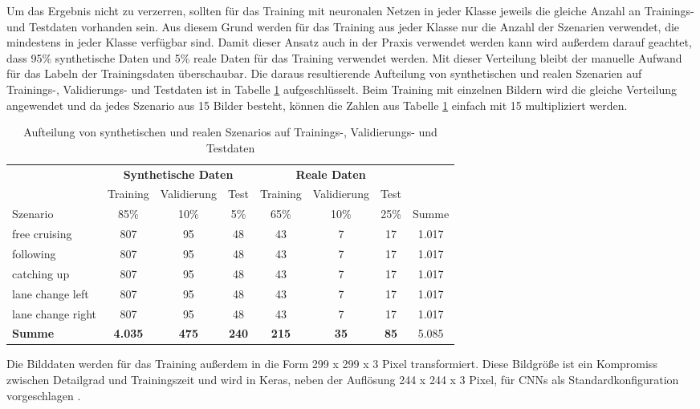 Um das Ergebnis nicht zu verzerren, sollten für das Training mit neuronalen Netzen in jeder Klasse jeweils die gleiche Anzahl an Trainings- und Testdaten vorhanden sein. Aus diesem Grund werden für das Training aus jeder Klasse nur die Anzahl der Szenarien verwendet, die mindestens in jeder Klasse verfügbar sind. Damit dieser Ansatz auch in der Praxis verwendet werden kann wird außerdem darauf geachtet, dass 95\% synthetische Daten und 5\% reale Daten für das Training verwendet werden. Mit dieser Verteilung bleibt der manuelle Aufwand für das Labeln der Trainingsdaten überschaubar. Die daraus resultierende Aufteilung von synthetischen und realen Szenarien auf Trainings-, Validierungs- und Testdaten ist in Tabelle \ref{tab_daten_aufteilung} aufgeschlüsselt. Beim Training mit einzelnen Bildern wird die gleiche Verteilung angewendet und da jedes Szenario aus 15 Bilder besteht, können die Zahlen aus Tabelle \ref{tab_daten_aufteilung} einfach mit 15 multipliziert werden.

\begin{table}[h]
\small
\centering
\def\arraystretch{1.4}
\begin{tabular}{l | c c c c c c | c}

& \multicolumn{3}{c}{\textbf{Synthetische Daten}} & \multicolumn{3}{c|}{\textbf{\textbf{Reale Daten}}} & \\
& Training & Validierung & Test & Training & Validierung & Test & \\
Szenario & 85\% & 10\% & 5\% & 65\% & 10\% & 25\% & Summe \\
\hline
free cruising & 807 & 95 & 48 & 43 & 7 & 17 & 1.017 \\
following & 807 & 95 & 48 & 43 & 7 & 17 & 1.017 \\
catching up & 807 & 95 & 48 & 43 & 7 & 17 & 1.017 \\
lane change left & 807 & 95 & 48 & 43 & 7 & 17 & 1.017 \\
lane change right & 807 & 95 & 48 & 43 & 7 & 17 & 1.017 \\
\hline
\textbf{Summe} & \textbf{4.035} & \textbf{475} & \textbf{240} & \textbf{215} & \textbf{35} & \textbf{85} & 5.085 \\
\hline

\end{tabular}
\caption{Aufteilung von synthetischen und realen Szenarios auf Trainings-, Validierungs- und Testdaten}
\label{tab_daten_aufteilung}
\end{table}

Die Bilddaten werden für das Training außerdem in die Form 299 x 299 x 3 Pixel transformiert. Diese Bildgröße ist ein Kompromiss zwischen Detailgrad und Trainingszeit und wird in Keras, neben der Auflösung 244 x 244 x 3 Pixel, für \acp{CNN} als Standardkonfiguration vorgeschlagen \cite{chollet2015keras}.

